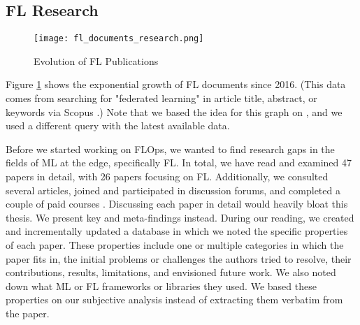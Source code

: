 %
%
%
\subsection{FL Research}\label{subsection:fl_research}

\begin{figure}[h]
    \centering
    \texttt{[image: fl\_documents\_research.png]}
    \caption{Evolution of FL Publications}
    \label{fig:fl_documents_research}
\end{figure}

Figure \ref{fig:fl_documents_research} shows the exponential growth of FL documents
since 2016. (This data comes from searching for "federated learning" in article title, abstract, or keywords via Scopus \cite{scopus_homepage}.)
Note that we based the idea for this graph on \cite{thesis:tum_fl_framework_comparison},
and we used a different query with the latest available data.

Before we started working on FLOps, we wanted to find research gaps in the fields of 
ML at the edge, specifically FL.
In total, we have read and examined 47 papers in detail, with 26 papers focusing on FL. 
Additionally, we consulted several articles,
joined and participated in discussion forums,
and completed a couple of paid courses \cite{udemy_homepage}.
Discussing each paper in detail would heavily bloat this thesis.
We present key and meta-findings instead.
During our reading, we created and incrementally updated a database in which we noted the specific properties of each paper.
These properties include one or multiple categories in which the paper fits in, the initial problems or challenges the authors tried to resolve,
their contributions, results, limitations, and envisioned future work.
We also noted down what ML or FL frameworks or libraries they used.
We based these properties on our subjective analysis instead of extracting them verbatim from the paper.

